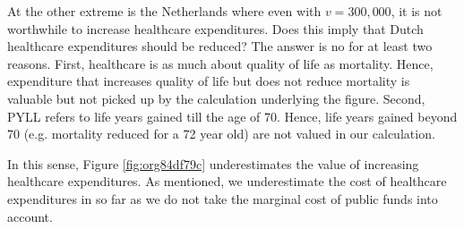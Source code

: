 \documentclass{article}
\begin{document}
At the other extreme is the Netherlands where even with \(v = 300,000\), it is not worthwhile to increase healthcare expenditures. Does this imply that Dutch healthcare expenditures should be reduced? The answer is no for at least two reasons. First, healthcare is as much about quality of life as mortality. Hence, expenditure that increases quality of life but does not reduce mortality is valuable but not picked up by the calculation underlying the figure. Second, PYLL refers to life years gained till the age of 70. Hence, life years gained beyond 70 (e.g. mortality reduced for a 72 year old) are not valued in our calculation.

In this sense, Figure \ref{fig:org84df79c} underestimates the value of increasing healthcare expenditures. As mentioned, we underestimate the cost of healthcare expenditures in so far as we do not take the marginal cost of public funds into account.
\end{document}
